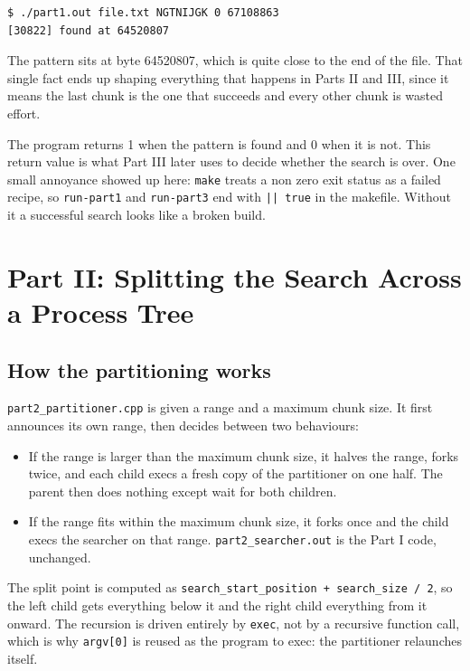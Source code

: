 \documentclass[11pt]{article}
\begin{document}
\begin{verbatim}
$ ./part1.out file.txt NGTNIJGK 0 67108863
[30822] found at 64520807
\end{verbatim}

The pattern sits at byte 64520807, which is quite close to the end of the file.
That single fact ends up shaping everything that happens in Parts II and III, since
it means the last chunk is the one that succeeds and every other chunk is wasted
effort.

The program returns 1 when the pattern is found and 0 when it is not. This return
value is what Part III later uses to decide whether the search is over. One small
annoyance showed up here: \texttt{make} treats a non zero exit status as a failed
recipe, so \texttt{run-part1} and \texttt{run-part3} end with \texttt{|| true} in
the makefile. Without it a successful search looks like a broken build.

\section*{Part II: Splitting the Search Across a Process Tree}

\subsection*{How the partitioning works}
\texttt{part2\_partitioner.cpp} is given a range and a maximum chunk size. It first
announces its own range, then decides between two behaviours:

\begin{itemize}
	\item If the range is larger than the maximum chunk size, it halves the range,
	forks twice, and each child execs a fresh copy of the partitioner on one half.
	The parent then does nothing except wait for both children.
	\item If the range fits within the maximum chunk size, it forks once and the
	child execs the searcher on that range.
	\texttt{part2\_searcher.out} is the Part I code, unchanged.
\end{itemize}

The split point is computed as
\texttt{search\_start\_position + search\_size / 2}, so the left child gets
everything below it and the right child everything from it onward. The recursion
is driven entirely by \texttt{exec}, not by a recursive function call, which is why
\texttt{argv[0]} is reused as the program to exec: the partitioner relaunches
itself.
\end{document}
